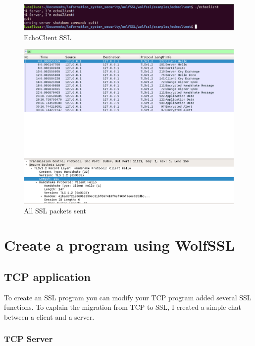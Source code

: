 \documentclass[a4paper,12pt]{report}
\begin{document}
\begin{figure}[H]
\hspace*{-1cm}     
    \centering
    \includegraphics[scale=0.25]{test/examples/echoclient-echoserver/echoClient.png}
    \caption{EchoClient SSL}
    \label{fig:galaxy}
\end{figure}

\begin{figure}[H]
\hspace*{-2cm}     
    \centering
    \includegraphics[scale=0.3]{test/examples/echoclient-echoserver/wireshark.png}
    \caption{All SSL packets sent}
    \label{fig:galaxy}
\end{figure}

\chapter{Create a program using WolfSSL}
\section{TCP application}
To create an SSL program you can modify your TCP program added several SSL functions. To explain the migration from TCP to SSL, I created a simple chat between a client and a server.
\subsection{TCP Server}
\end{document}
